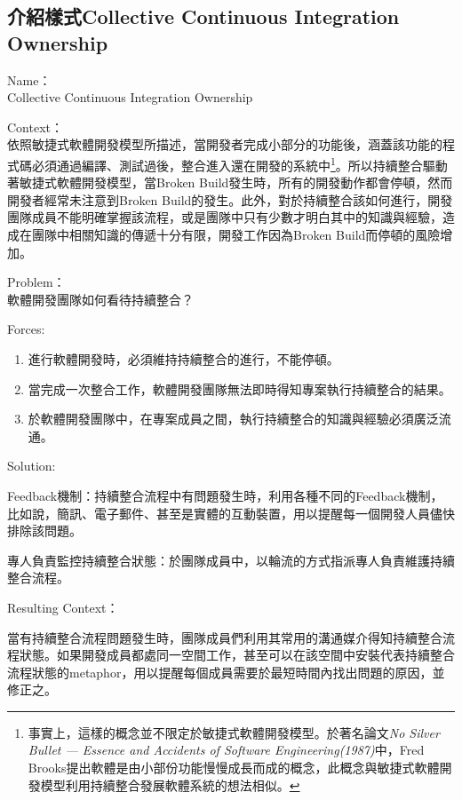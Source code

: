 \subsection{介紹樣式Collective Continuous Integration Ownership}
\begin{description}
\item Name：\\
Collective Continuous Integration Ownership
\item Context：\\
依照敏捷式軟體開發模型所描述，當開發者完成小部分的功能後，涵蓋該功能的程式碼必須通過編譯、測試過後，整合進入還在開發的系統中\footnote{事實上，這樣的概念並不限定於敏捷式軟體開發模型。於著名論文\textit{No Silver Bullet — Essence and Accidents of Software Engineering(1987)}中，Fred Brooks提出軟體是由小部份功能慢慢成長而成的概念\cite{nosilverbullet}，此概念與敏捷式軟體開發模型利用持續整合發展軟體系統的想法相似。}。所以持續整合驅動著敏捷式軟體開發模型，當Broken Build發生時，所有的開發動作都會停頓，然而開發者經常未注意到Broken Build的發生。此外，對於持續整合該如何進行，開發團隊成員不能明確掌握該流程，或是團隊中只有少數才明白其中的知識與經驗，造成在團隊中相關知識的傳遞十分有限，開發工作因為Broken Build而停頓的風險增加。 
\item Problem：\\
軟體開發團隊如何看待持續整合？
\item Forces: 
\begin{enumerate}
\item 進行軟體開發時，必須維持持續整合的進行，不能停頓。
\item 當完成一次整合工作，軟體開發團隊無法即時得知專案執行持續整合的結果。
\item 於軟體開發團隊中，在專案成員之間，執行持續整合的知識與經驗必須廣泛流通。 
\end {enumerate}
\item Solution: 
\begin{description}
\item Feedback機制：持續整合流程中有問題發生時，利用各種不同的Feedback機制，比如說，簡訊、電子郵件、甚至是實體的互動裝置，用以提醒每一個開發人員儘快排除該問題。 
\item 專人負責監控持續整合狀態：於團隊成員中，以輪流的方式指派專人負責維護持續整合流程。
\end{description}
\item Resulting Context：
\begin{description} 
\item 當有持續整合流程問題發生時，團隊成員們利用其常用的溝通媒介得知持續整合流程狀態。如果開發成員都處同一空間工作，甚至可以在該空間中安裝代表持續整合流程狀態的metaphor，用以提醒每個成員需要於最短時間內找出問題的原因，並修正之。

\end{description}
\end{description}
